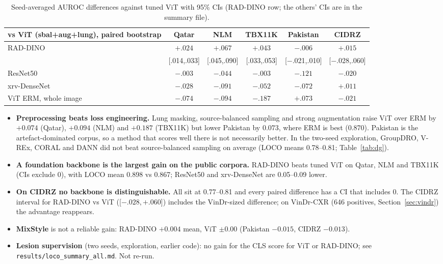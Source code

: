 \documentclass[10pt,a4paper]{article}
\begin{document}
\begin{table}[H]\centering\footnotesize
\begin{tabular}{lccccc}\toprule
vs ViT (sbal+aug+lung), paired bootstrap & Qatar & NLM & TBX11K & Pakistan & CIDRZ\\\midrule
RAD-DINO & $+.024$ & $+.067$ & $+.043$ & $-.006$ & $+.015$\\
 & {\tiny[.014,.033]} & {\tiny[.045,.090]} & {\tiny[.033,.053]} & {\tiny[$-$.021,.010]} & {\tiny[$-$.028,.060]}\\
ResNet50 & $-.003$ & $-.044$ & $-.003$ & $-.121$ & $-.020$\\
xrv-DenseNet & $-.028$ & $-.091$ & $-.052$ & $-.072$ & $+.011$\\
ViT ERM, whole image & $-.074$ & $-.094$ & $-.187$ & $+.073$ & $-.021$\\\bottomrule
\end{tabular}\caption{Seed-averaged AUROC differences against tuned ViT with 95\% CIs (RAD-DINO row; the others' CIs are in the summary file).}\end{table}
\begin{itemize}
\item \textbf{Preprocessing beats loss engineering.} Lung masking, source-balanced sampling and strong augmentation raise ViT over ERM by $+0.074$ (Qatar), $+0.094$ (NLM) and $+0.187$ (TBX11K) but lower Pakistan by $0.073$, where ERM is best (0.870). Pakistan is the artefact-dominated corpus, so a method that scores well there is not necessarily better. In the two-seed exploration, GroupDRO, V-REx, CORAL and DANN did not beat source-balanced sampling on average (LOCO means 0.78--0.81; Table~\ref{tab:dg}).
\item \textbf{A foundation backbone is the largest gain on the public corpora.} RAD-DINO beats tuned ViT on Qatar, NLM and TBX11K (CIs exclude 0), with LOCO mean 0.898 vs 0.867; ResNet50 and xrv-DenseNet are 0.05--0.09 lower.
\item \textbf{On CIDRZ no backbone is distinguishable.} All sit at 0.77--0.81 and every paired difference has a CI that includes 0. The CIDRZ interval for RAD-DINO vs ViT ([$-.028,+.060$]) includes the VinDr-sized difference; on VinDr-CXR (646 positives, Section~\ref{sec:vindr}) the advantage reappears.
\item \textbf{MixStyle} is not a reliable gain: RAD-DINO $+0.004$ mean, ViT $\pm0.00$ (Pakistan $-0.015$, CIDRZ $-0.013$).
\item \textbf{Lesion supervision} (two seeds, exploration, earlier code): no gain for the CLS score for ViT or RAD-DINO; see \texttt{results/loco\_summary\_all.md}. Not re-run.
\end{itemize}
\end{document}
